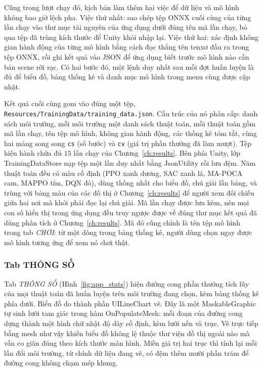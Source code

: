 \indent Cũng trong lượt chạy đó, kịch bản làm thêm hai việc để dữ liệu và mô hình không
bao giờ lệch pha. Việc thứ nhất: sao chép tệp ONNX cuối cùng của từng lần chạy vào thư mục
tài nguyên của ứng dụng dưới đúng tên mã lần chạy, bỏ qua tệp đã trùng kích thước để Unity
khỏi nhập lại. Việc thứ hai: xác định không gian hành động của từng mô hình bằng cách đọc
thẳng tên tenxơ đầu ra trong tệp ONNX, rồi ghi kết quả vào JSON để ứng dụng biết trước mô
hình nào cần bản scene rời rạc. Có hai bước đó, một lệnh duy nhất sau mỗi đợt huấn luyện
là đủ để biểu đồ, bảng thống kê và danh mục mô hình trong menu cùng được cập nhật.

{\sloppy
\indent Kết quả cuối cùng gom vào đúng một tệp,
\texttt{Resources/\allowbreak TrainingData/\allowbreak training\_data.json}. Cấu trúc của
nó phân cấp: danh sách môi trường, mỗi môi trường một danh sách thuật toán, mỗi thuật toán
gồm mã lần chạy, tên tệp mô hình, không gian hành động, các thống kê tóm tắt, cùng hai
mảng song song \texttt{cs} (số bước) và \texttt{cv} (giá trị phần thưởng đã làm mượt). Tệp
hiện hành chứa đủ $15$ lần chạy của Chương~\ref{ch:results}. Bên phía Unity, lớp
TrainingDataStore nạp tệp một lần duy nhất bằng JsonUtility rồi lưu đệm.
Năm thuật toán đều có màu cố định (PPO xanh dương, SAC xanh lá, MA-POCA cam, MAPPO tím, DQN
đỏ), dùng thống nhất cho biểu đồ, chú giải lẫn bảng, và trùng với bảng màu của các đồ
thị ở Chương~\ref{ch:results} để người xem đối chiếu giữa hai nơi mà khỏi phải đọc lại chú
giải. Mã lần chạy được lưu kèm, nên mọi con số hiển thị trong ứng dụng đều truy ngược được
về đúng thư mục kết quả đã dùng phân tích ở Chương~\ref{ch:results}. Mã đó cũng chính là
tên tệp mô hình trong tab \textit{CHƠI}: từ một dòng trong bảng thống kê, người dùng chọn
ngay được mô hình tương ứng để xem nó chơi thật.\par}

\subsubsection{Tab THÔNG SỐ}

\indent Tab \textit{THÔNG SỐ} (Hình~\ref{fig:app_stats}) hiện đường cong phần thưởng tích
lũy của mọi thuật toán đã huấn luyện trên môi trường đang chọn, kèm bảng thống kê phía
dưới. Biểu đồ do thành phần UILineChart vẽ. Đây là một MaskableGraphic
tự sinh lưới tam giác trong hàm OnPopulateMesh: mỗi đoạn của đường cong dựng
thành một hình chữ nhật độ dày cố định, kèm lưới nền và trục. Vẽ trực tiếp bằng mesh như
vậy khiến biểu đồ không lệ thuộc thư viện đồ thị ngoài nào mà vẫn co giãn đúng theo kích
thước màn hình. Miền giá trị hai trục thì tính lại mỗi lần đổi môi trường, từ chính dữ
liệu đang vẽ, có đệm thêm mười phần trăm để đường cong không chạm mép khung.

